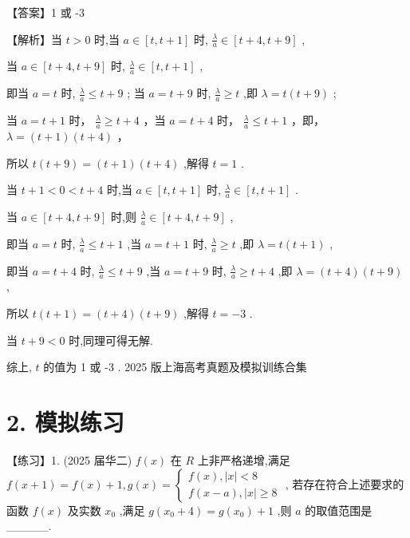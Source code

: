 \documentclass[10pt]{article}
\begin{document}
【答案】1 或 -3

【解析】当 \(t > 0\) 时,当 \(a \in  \left\lbrack  {t,t + 1}\right\rbrack\) 时, \(\frac{\lambda }{a} \in  \left\lbrack  {t + 4,t + 9}\right\rbrack\) ,

当 \(a \in  \left\lbrack  {t + 4,t + 9}\right\rbrack\) 时, \(\frac{\lambda }{a} \in  \left\lbrack  {t,t + 1}\right\rbrack\) ,

即当 \(a = t\) 时, \(\frac{\lambda }{a} \leq  t + 9\) ; 当 \(a = t + 9\) 时, \(\frac{\lambda }{a} \geq  t\) ,即 \(\lambda  = t\left( {t + 9}\right)\) ;

当 \(a = t + 1\) 时， \(\frac{\lambda }{a} \geq  t + 4\) ，当 \(a = t + 4\) 时， \(\frac{\lambda }{a} \leq  t + 1\) ，即， \(\lambda  = \left( {t + 1}\right) \left( {t + 4}\right)\) ，

所以 \(t\left( {t + 9}\right)  = \left( {t + 1}\right) \left( {t + 4}\right)\) ,解得 \(t = 1\) .

当 \(t + 1 < 0 < t + 4\) 时,当 \(a \in  \left\lbrack  {t,t + 1}\right\rbrack\) 时, \(\frac{\lambda }{a} \in  \left\lbrack  {t,t + 1}\right\rbrack\) .

当 \(a \in  \left\lbrack  {t + 4,t + 9}\right\rbrack\) 时,则 \(\frac{\lambda }{a} \in  \left\lbrack  {t + 4,t + 9}\right\rbrack\) ,

即当 \(a = t\) 时, \(\frac{\lambda }{a} \leq  t + 1\) ,当 \(a = t + 1\) 时, \(\frac{\lambda }{a} \geq  t\) ,即 \(\lambda  = t\left( {t + 1}\right)\) ,

即当 \(a = t + 4\) 时, \(\frac{\lambda }{a} \leq  t + 9\) ,当 \(a = t + 9\) 时, \(\frac{\lambda }{a} \geq  t + 4\) ,即 \(\lambda  = \left( {t + 4}\right) \left( {t + 9}\right)\) ,

所以 \(t\left( {t + 1}\right)  = \left( {t + 4}\right) \left( {t + 9}\right)\) ,解得 \(t =  - 3\) .

当 \(t + 9 < 0\) 时,同理可得无解.

综上, \(t\) 的值为 1 或 -3 . 2025 版上海高考真题及模拟训练合集

\section*{2. 模拟练习}

【练习】1. (2025 届华二) \(f\left( x\right)\) 在 \(R\) 上非严格递增,满足 \(f\left( {x + 1}\right)  = f\left( x\right)  + 1,g\left( x\right)  = \left\{  \begin{array}{l} f\left( x\right) ,\left| x\right|  < 8 \\  f\left( {x - a}\right) ,\left| x\right|  \geq  8 \end{array}\right.\) , 若存在符合上述要求的函数 \(f\left( x\right)\) 及实数 \({x}_{0}\) ,满足 \(g\left( {{x}_{0} + 4}\right)  = g\left( {x}_{0}\right)  + 1\) ,则 \(a\) 的取值范围是\_\_\_\_\_.
\end{document}
